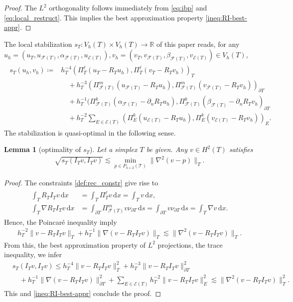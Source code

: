 \documentclass[a4paper]{amsart}
\numberwithin{equation}{section}
\def\F{\mathcal{F}}
\def\E{\mathcal{E}}
\def\T{\mathcal{T}}
\newcommand\ds{\,\text{d}s}
\newcommand\dx{\,\text{d}x}
\newtheorem{lemma}[theorem]{Lemma}
\theoremstyle{definition}
\theoremstyle{remark}
\numberwithin{theorem}{section}
\numberwithin{equation}{section}
\numberwithin{table}{section}
\numberwithin{figure}{section}
\begin{document}
\begin{proof}
    The $L^2$ orthogonality follows immediately from \eqref{eq:ibp} and \eqref{eq:local_restruct}. This implies the best approximation property \eqref{ineq:RI-best-appr}.
\end{proof}
The local stabilization $s_T : V_h(T) \times V_h(T) \to \mathbb{R}$ of this paper reads, for any $u_h = (u_T, u_{\mathcal{F}(T)}, \alpha_{\mathcal{F}(T)}, u_{\E(T)}), v_h = (v_T, v_{\F(T)}, \beta_{\F(T)}, v_{\E(T)}) \in V_h(T)$,
\begin{align}\label{def:stab_loc}
    \begin{aligned}
        s_T(u_h,v_h) \coloneqq  &  h_T^{-4} (\Pi_T^{\ell}(u_{T} - R_T u_h), \Pi_{T}^{\ell}(v_T - R_T v_h))_{T}\\
    	&\quad + h_T^{-3} (\Pi_{\F(T)}^{m}(u_{\F(T)} - R_T u_h),\Pi_{\F(T)}^{m}(v_{\F(T)} - R_T v_h))_{\partial T}\\
        &\quad + h_T^{-1} (\Pi_{\F(T)}^k(\alpha_{\F(T)}-\partial_n R_T u_h),\Pi_{\F(T)}^k(\beta_{\F(T)} - \partial_n R_T v_h)_{\partial T}\\
    	&\quad + h_T^{-2} \sum_{E \in \E(T)} (\Pi_{E}^{k}(u_{\E(T)} -R_T u_h),\Pi_{E}^{k}(v_{\E(T)} - R_T v_h))_{E}.
    \end{aligned}
\end{align}
The stabilization is quasi-optimal in the following sense.
\begin{lemma}[optimality of $s_T$]\label{lem:best-appr-stab}
    Let a simplex $T$ be given. Any $v \in H^2(T)$ satisfies
    \begin{align*}
        \sqrt{s_T(I_T v, I_T v)} \lesssim \min_{p \in P_{k+2}(\T)} \|\nabla^2(v - p)\|_T.
    \end{align*}
\end{lemma}
\begin{proof}
    The constraints \eqref{def:rec_constr} give rise to
    \begin{align}\label{eq:vanishing_mean}
    	\begin{aligned}
    		\int_T R_T I_T v \dx &= \int_T \Pi_T^\ell v \dx = \int_T v \dx,\\
    		\int_T \nabla R_T I_T v \dx &= \int_{\partial T} \Pi_{\F(T)}^m v \nu_{\partial T} \ds = \int_{\partial T} v \nu_{\partial T} \ds = \int_T \nabla v \dx.
    	\end{aligned}
    \end{align}
    Hence, the Poincar\'e inequality imply
    \begin{align}
        h_T^{-2} \|v - R_T I_T v\|_T + h_T^{-1} \|\nabla(v - R_T I_T v)\|_T \lesssim \|\nabla^2(v - R_T I_T v)\|_T.
    \end{align}
    From this, the best approximation property of $L^2$ projections, the trace inequality, we infer
    \begin{align*}
        &s_T(I_T v, I_T v) \leq h_T^{-4} \|v - R_T I_T v\|_T^2 + h_T^{-3}\|v - R_T I_T v\|_{\partial T}^2\\
        &\quad+ h_T^{-1} \|\nabla(v - R_T I_T v)\|_{\partial T}^2 + \sum_{E \in \E(T)} h_T^{-2} \|v - R_T I_T v\|_E^2 \lesssim \|\nabla^2(v - R_T I_T v)\|_T^2.
    \end{align*}
    This and \eqref{ineq:RI-best-appr} conclude the proof.
\end{proof}
\end{document}
